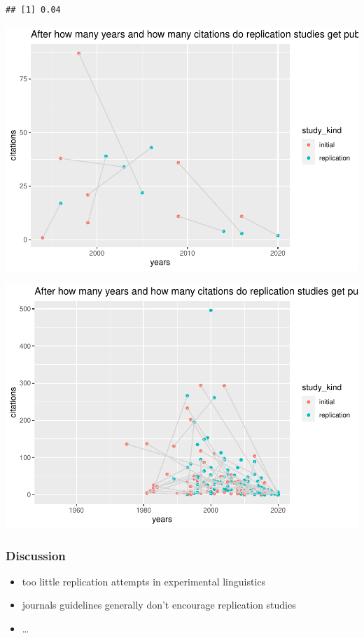\documentclass[]{elsarticle} %
\providecommand{\tightlist}{%
  \setlength{\itemsep}{0pt}\setlength{\parskip}{0pt}}
\begin{document}
\begin{verbatim}
## [1] 0.04
\end{verbatim}

\includegraphics{ReplicationLing_files/figure-latex/plot cit and years direct-1.pdf}

\includegraphics{ReplicationLing_files/figure-latex/plot cit and years all-1.pdf}

\hypertarget{discussion}{%
\subsubsection{Discussion}\label{discussion}}

\begin{itemize}
\tightlist
\item
  too little replication attempts in experimental linguistics
\item
  journals guidelines generally don't encourage replication studies
\item
  \ldots{}
\end{itemize}
\end{document}
